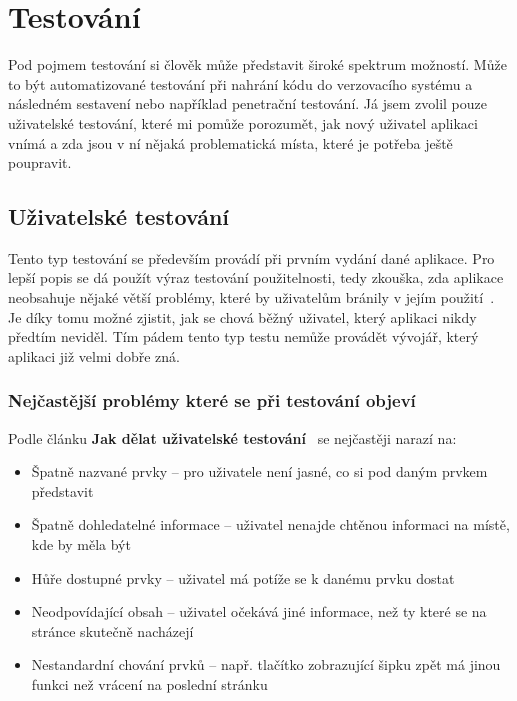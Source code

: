 
\chapter{Testování}

Pod pojmem testování si člověk může představit široké spektrum možností. Může to být automatizované testování při nahrání kódu
do verzovacího systému a následném sestavení nebo například penetrační testování. Já jsem zvolil pouze uživatelské testování,
které mi pomůže porozumět, jak nový uživatel aplikaci vnímá a zda jsou v ní nějaká problematická místa, které je potřeba ještě
poupravit.

\section{Uživatelské testování}
Tento typ testování se především provádí při prvním vydání dané aplikace. Pro lepší popis se dá použít výraz testování použitelnosti,
tedy zkouška, zda aplikace neobsahuje nějaké větší problémy, které by uživatelům bránily v jejím použití~\cite{UserTesting}. Je díky tomu možné
zjistit, jak se chová běžný uživatel, který aplikaci nikdy předtím neviděl. Tím pádem tento typ testu nemůže provádět vývojář,
který aplikaci již velmi dobře zná.

\subsection{Nejčastější problémy které se při testování objeví}

Podle článku \textbf{Jak dělat uživatelské testování}~\cite{UserTesting} se nejčastěji narazí na:

\begin{itemize}
    \item Špatně nazvané prvky -- pro uživatele není jasné, co si pod daným prvkem představit
    \item Špatně dohledatelné informace -- uživatel nenajde chtěnou informaci na místě, kde by měla být
    \item Hůře dostupné prvky -- uživatel má potíže se k danému prvku dostat
    \item Neodpovídající obsah -- uživatel očekává jiné informace, než ty které se na stránce skutečně nacházejí
    \item Nestandardní chování prvků -- např. tlačítko zobrazující šipku zpět má jinou funkci než vrácení na poslední stránku
\end{itemize}

